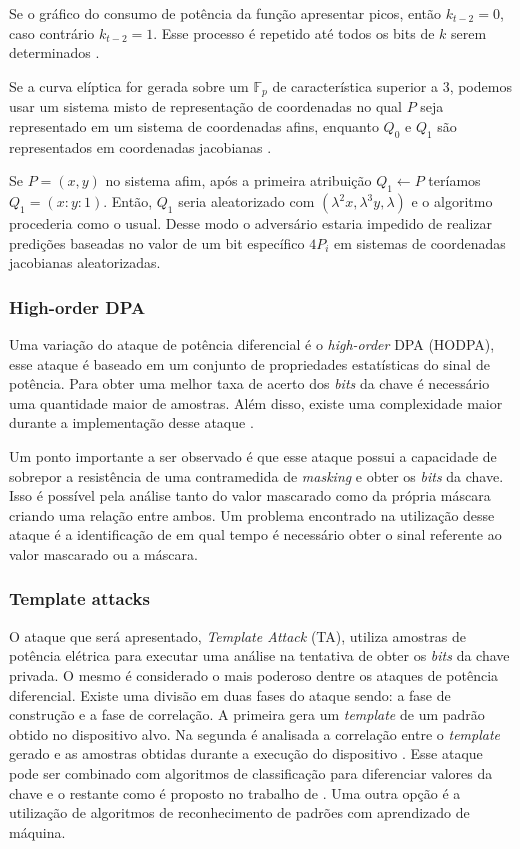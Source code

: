 Se o gr\'{a}fico do consumo de pot\^{e}ncia da fun\c{c}\~{a}o apresentar picos, ent\~{a}o $k_{t-2} = 0$, caso contr\'{a}rio $k_{t-2} = 1$.
Esse processo \'{e} repetido at\'{e} todos os bits de $k$ serem determinados \cite{ECCBook_HankersonVanstone2004}.

Se a curva el\'{i}ptica for gerada sobre um $\mathbb{F}_{p}$ de caracter\'{i}stica superior a 3, podemos usar um sistema misto de representa\c{c}\~{a}o de coordenadas no qual $P$ seja representado em um sistema de coordenadas afins, enquanto $Q_{0}$ e $Q_{1}$ s\~{a}o representados em coordenadas jacobianas \cite{ECCBook_HankersonVanstone2004}.

Se $P = (x,y)$ no sistema afim, ap\'{o}s a primeira atribui\c{c}\~{a}o $Q_{1} \leftarrow P$ ter\'{i}amos $ Q_{1} = (x : y : 1)$. Ent\~{a}o, $Q_{1}$ seria aleatorizado com $(\lambda^{2}x, \lambda^{3}y, \lambda)$ e o algoritmo procederia como o usual. Desse modo o advers\'{a}rio estaria impedido de realizar predi\c{c}\~{o}es baseadas no valor de um bit espec\'{i}fico $4P_{i}$ em sistemas de coordenadas jacobianas aleatorizadas.

\subsubsection{High-order DPA}
Uma variação do ataque de potência diferencial é o \textit{high-order} DPA (HODPA), esse ataque é baseado em um conjunto de propriedades estatísticas do sinal de potência. Para obter uma melhor taxa de acerto dos \textit{bits} da chave é necessário uma quantidade maior de amostras. Além disso, existe uma complexidade maior durante a implementação desse ataque \cite{benedikt:2009:228}.

Um ponto importante a ser observado é que esse ataque possui a capacidade de sobrepor a resistência de uma contramedida de \textit{masking} e obter os \textit{bits} da chave. Isso é possível pela análise tanto do valor mascarado como da própria máscara criando uma relação entre ambos. Um problema encontrado na utilização desse ataque é a identificação de em qual tempo é necessário obter o sinal referente ao valor mascarado ou a máscara.

\subsubsection{Template attacks}
O ataque que será apresentado, \textit{Template Attack} (TA), utiliza amostras de potência elétrica para executar uma análise na tentativa de obter os \textit{bits} da chave privada. O mesmo é considerado o mais poderoso dentre os ataques de potência diferencial. Existe uma divisão em duas fases do ataque sendo: a fase de construção e a fase de correlação. A primeira gera um \textit{template} de um padrão obtido no dispositivo alvo. Na segunda é analisada a correlação entre o \textit{template} gerado e as amostras obtidas durante a execução do dispositivo \cite{ozgen:2016}. Esse ataque pode ser combinado com algoritmos de classificação para diferenciar valores da chave e o restante como é proposto no trabalho de \cite{ozgen:2016}. Uma outra opção é a utilização de algoritmos de reconhecimento de padrões com aprendizado de máquina.

